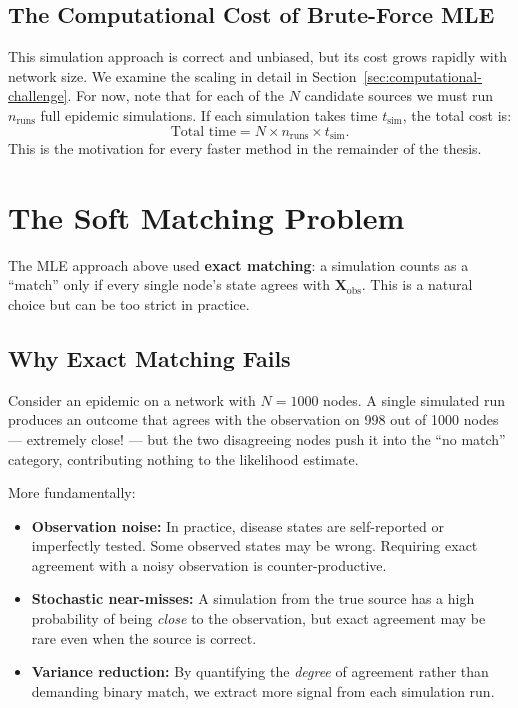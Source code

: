 \subsection{The Computational Cost of Brute-Force MLE}

This simulation approach is correct and unbiased, but its cost grows rapidly
with network size. We examine the scaling in detail in
Section~\ref{sec:computational-challenge}. For now, note that for each of the
$N$ candidate sources we must run $n_{\text{runs}}$ full epidemic simulations.
If each simulation takes time $t_{\text{sim}}$, the total cost is:
\[
    \text{Total time} = N \times n_{\text{runs}} \times t_{\text{sim}}.
\]
This is the motivation for every faster method in the remainder of the thesis.

\section{The Soft Matching Problem}
\label{sec:soft-matching}

The MLE approach above used \textbf{exact matching}: a simulation counts as a
``match'' only if every single node's state agrees with $\mathbf{X}_{\text{obs}}$.
This is a natural choice but can be too strict in practice.

\subsection{Why Exact Matching Fails}

Consider an epidemic on a network with $N = 1000$ nodes. A single simulated
run produces an outcome that agrees with the observation on 998 out of 1000
nodes — extremely close! — but the two disagreeing nodes push it into the
``no match'' category, contributing nothing to the likelihood estimate.

More fundamentally:

\begin{itemize}
    \item \textbf{Observation noise:} In practice, disease states are
    self-reported or imperfectly tested. Some observed states may be wrong.
    Requiring exact agreement with a noisy observation is counter-productive.
    \item \textbf{Stochastic near-misses:} A simulation from the true source
    has a high probability of being \emph{close} to the observation, but exact
    agreement may be rare even when the source is correct.
    \item \textbf{Variance reduction:} By quantifying the \emph{degree} of
    agreement rather than demanding binary match, we extract more signal from
    each simulation run.
\end{itemize}

